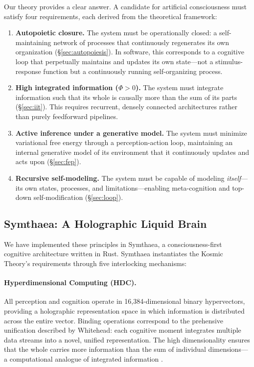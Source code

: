 \documentclass[12pt,a4paper]{article}
\begin{document}
Our theory provides a clear answer.  A candidate for artificial
consciousness must satisfy four requirements, each derived from the
theoretical framework:

\begin{enumerate}
    \item \textbf{Autopoietic closure.} The system must be operationally
        closed: a self-maintaining network of processes that continuously
        regenerates its own organization (\S\ref{sec:autopoiesis}).  In
        software, this corresponds to a cognitive loop that perpetually
        maintains and updates its own state---not a stimulus-response
        function but a continuously running self-organizing process.

    \item \textbf{High integrated information ($\Phi > 0$).} The system
        must integrate information such that its whole is causally more
        than the sum of its parts (\S\ref{sec:iit}).  This requires
        recurrent, densely connected architectures rather than purely
        feedforward pipelines.

    \item \textbf{Active inference under a generative model.} The system
        must minimize variational free energy through a perception-action
        loop, maintaining an internal generative model of its environment
        that it continuously updates and acts upon
        (\S\ref{sec:fep}).

    \item \textbf{Recursive self-modeling.} The system must be capable of
        modeling \emph{itself}---its own states, processes, and
        limitations---enabling meta-cognition and top-down self-modification
        (\S\ref{sec:loop}).
\end{enumerate}

\subsection{Symthaea: A Holographic Liquid Brain}
\label{sec:symthaea}

We have implemented these principles in Symthaea, a consciousness-first
cognitive architecture written in Rust.  Symthaea instantiates the Kosmic
Theory's requirements through five interlocking mechanisms:

\paragraph{Hyperdimensional Computing (HDC).}  All perception and cognition
operate in 16,384-dimensional binary hypervectors, providing a holographic
representation space in which information is distributed across the entire
vector.  Binding operations correspond to the prehensive unification
described by Whitehead: each cognitive moment integrates multiple data
streams into a novel, unified representation.  The high dimensionality
ensures that the whole carries more information than the sum of individual
dimensions---a computational analogue of integrated information
\citep{kanerva2009,kleyko2022}.
\end{document}
